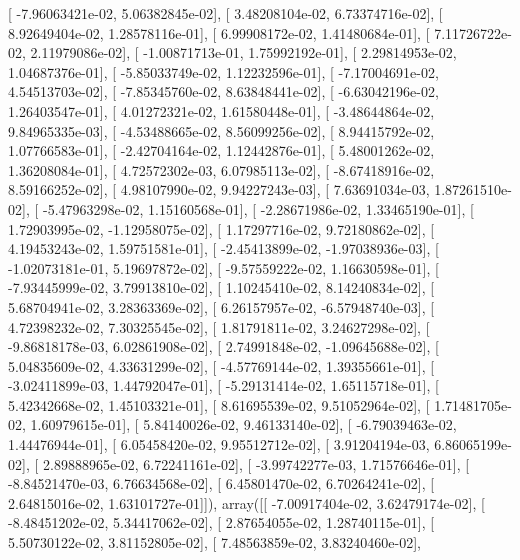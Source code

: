 \documentclass{article}
\begin{document}
       [ -7.96063421e-02,   5.06382845e-02],
       [  3.48208104e-02,   6.73374716e-02],
       [  8.92649404e-02,   1.28578116e-01],
       [  6.99908172e-02,   1.41480684e-01],
       [  7.11726722e-02,   2.11979086e-02],
       [ -1.00871713e-01,   1.75992192e-01],
       [  2.29814953e-02,   1.04687376e-01],
       [ -5.85033749e-02,   1.12232596e-01],
       [ -7.17004691e-02,   4.54513703e-02],
       [ -7.85345760e-02,   8.63848441e-02],
       [ -6.63042196e-02,   1.26403547e-01],
       [  4.01272321e-02,   1.61580448e-01],
       [ -3.48644864e-02,   9.84965335e-03],
       [ -4.53488665e-02,   8.56099256e-02],
       [  8.94415792e-02,   1.07766583e-01],
       [ -2.42704164e-02,   1.12442876e-01],
       [  5.48001262e-02,   1.36208084e-01],
       [  4.72572302e-03,   6.07985113e-02],
       [ -8.67418916e-02,   8.59166252e-02],
       [  4.98107990e-02,   9.94227243e-03],
       [  7.63691034e-03,   1.87261510e-02],
       [ -5.47963298e-02,   1.15160568e-01],
       [ -2.28671986e-02,   1.33465190e-01],
       [  1.72903995e-02,  -1.12958075e-02],
       [  1.17297716e-02,   9.72180862e-02],
       [  4.19453243e-02,   1.59751581e-01],
       [ -2.45413899e-02,  -1.97038936e-03],
       [ -1.02073181e-01,   5.19697872e-02],
       [ -9.57559222e-02,   1.16630598e-01],
       [ -7.93445999e-02,   3.79913810e-02],
       [  1.10245410e-02,   8.14240834e-02],
       [  5.68704941e-02,   3.28363369e-02],
       [  6.26157957e-02,  -6.57948740e-03],
       [  4.72398232e-02,   7.30325545e-02],
       [  1.81791811e-02,   3.24627298e-02],
       [ -9.86818178e-03,   6.02861908e-02],
       [  2.74991848e-02,  -1.09645688e-02],
       [  5.04835609e-02,   4.33631299e-02],
       [ -4.57769144e-02,   1.39355661e-01],
       [ -3.02411899e-03,   1.44792047e-01],
       [ -5.29131414e-02,   1.65115718e-01],
       [  5.42342668e-02,   1.45103321e-01],
       [  8.61695539e-02,   9.51052964e-02],
       [  1.71481705e-02,   1.60979615e-01],
       [  5.84140026e-02,   9.46133140e-02],
       [ -6.79039463e-02,   1.44476944e-01],
       [  6.05458420e-02,   9.95512712e-02],
       [  3.91204194e-03,   6.86065199e-02],
       [  2.89888965e-02,   6.72241161e-02],
       [ -3.99742277e-03,   1.71576646e-01],
       [ -8.84521470e-03,   6.76634568e-02],
       [  6.45801470e-02,   6.70264241e-02],
       [  2.64815016e-02,   1.63101727e-01]]), array([[ -7.00917404e-02,   3.62479174e-02],
       [ -8.48451202e-02,   5.34417062e-02],
       [  2.87654055e-02,   1.28740115e-01],
       [  5.50730122e-02,   3.81152805e-02],
       [  7.48563859e-02,   3.83240460e-02],
\end{document}
